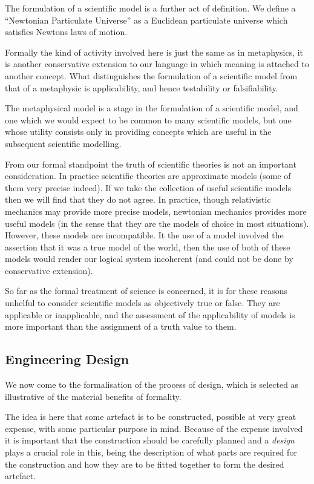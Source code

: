The formulation of a scientific model is a further act of definition.
We define a ``Newtonian Particulate Universe'' as a Euclidean particulate universe which satisfies Newtons laws of motion.

Formally the kind of activity involved here is just the same as in metaphysics, it is another conservative extension to our language in which meaning is attached to another concept.
What distinguishes the formulation of a scientific model from that of a metaphysic is applicability, and hence testability or falsifiability.

The metaphysical model is a stage in the formulation of a scientific model, and one which we would expect to be common to many scientific models, but one whose utility consists only in providing concepts which are useful in the subsequent scientific modelling.

From our formal standpoint the truth of scientific theories is not an important consideration.
In practice scientific theories are approximate models (some of them very precise indeed).
If we take the collection of useful scientific models then we will find that they do not agree.
In practice, though relativistic mechanics may provide more precise models, newtonian mechanics provides more useful models (in the sense that they are the models of choice in most situations).
However, these models are incompatible.
It the use of a model involved the assertion that it was a true model of the world, then the use of both of these models would render our logical system incoherent (and could not be done by conservative extension).

So far as the formal treatment of science is concerned, it is for these reasons unhelful to consider scientific models as objectively true or false.
They are applicable or inapplicable, and the assessment of the applicability of models is more important than the assignment of a truth value to them.

\subsection{Engineering Design}

We now come to the formalisation of the process of design, which is selected as illustrative of the material benefits of formality.

The idea is here that some artefact is to be constructed, possible at very great expense, with some particular purpose in mind.
Because of the expense involved it is important that the construction should be carefully planned and a {\it design} plays a crucial role in this, being the description of what parts are required for the construction and how they are to be fitted together to form the desired artefact.

